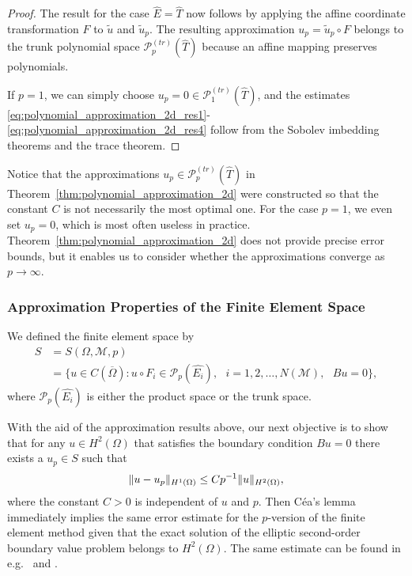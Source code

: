 \documentclass[english, 12pt, a4paper, sci, utf8, a-2b, online]{aaltothesis}
\theoremstyle{definition}
\theoremstyle{plain}
\DeclarePairedDelimiter\norm{\lVert}{\rVert}
\numberwithin{equation}{section}
\begin{document}
\begin{proof}
    The result for the case $\widehat{E} = \widehat{T}$
    now follows by applying the affine coordinate transformation $F$
    to $\tilde{u}$ and $\tilde{u}_p$.
    The resulting approximation $u_p = \tilde{u}_p \circ F$
    belongs to the trunk polynomial space $\mathcal{P}_p^{(tr)}(\widehat{T})$
    because an affine mapping preserves polynomials.

    If $p=1$, we can simply choose
    $u_p = 0 \in \mathcal{P}_{1}^{(tr)}(\widehat{T})$, and the estimates
    \eqref{eq:polynomial_approximation_2d_res1}-\eqref{eq:polynomial_approximation_2d_res4}
    follow from the Sobolev imbedding theorems and the trace theorem.
\end{proof}

Notice that the approximations $u_p \in \mathcal{P}_{p}^{(tr)}(\widehat{T})$
in Theorem~\ref{thm:polynomial_approximation_2d} were constructed
so that the constant $C$ is not necessarily the most optimal one.
For the case $p=1$, we even set $u_p = 0$, which is most often useless
in practice. Theorem~\ref{thm:polynomial_approximation_2d}
does not provide precise error bounds, but it enables us to consider
whether the approximations converge as $p \to \infty$.

\subsubsection{Approximation Properties of the Finite Element Space}
\label{subsubsec:approximation_properties_of_the_finite_element_space}

We defined the finite element space by
\begin{align*}
    S
    &= S(\Omega, \mathcal{M}, p) \\
    &= \{
        u \in C(\overline{\Omega})
            : u \circ F_i \in \mathcal{P}_p(\widehat{E_i}),
                \text{ } i=1,2,\dotsc,N(\mathcal{M}),
                    \text{ } Bu = 0
    \},
\end{align*}
where $\mathcal{P}_p(\widehat{E_i})$ is either the product space or the trunk space.

With the aid of the approximation results above,
our next objective is to show that for any $u \in H^2(\Omega)$
that satisfies the boundary condition $Bu=0$
there exists a $u_p \in S$ such that
\begin{equation}
    \label{eq:fem_conv_goal1}
    \norm{u-u_p}_{H^1(\Omega)}
    \leq C p^{-1} \norm{u}_{H^2(\Omega)},
\end{equation}
where the constant $C > 0$ is independent of $u$ and $p$.
Then Céa's lemma immediately implies the same error estimate
for the $p$-version of the finite element method given that
the exact solution of the elliptic second-order boundary value problem
belongs to $H^2(\Omega)$. The same estimate can be found in
e.g.\ \cite{babuskasuri1987} and \cite{babuskasuri1987hp}.
\end{document}

